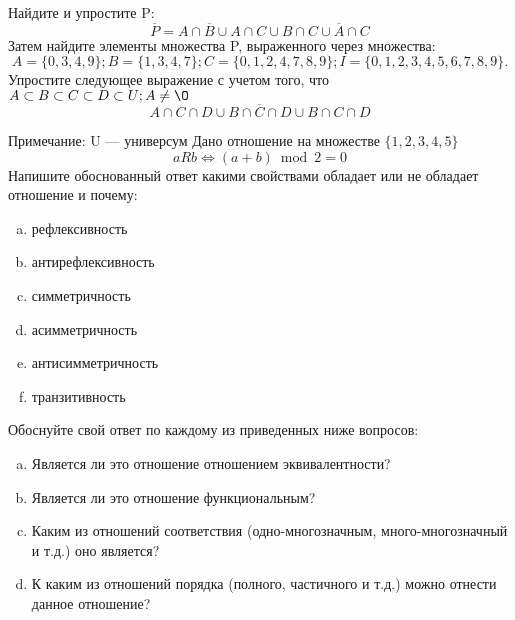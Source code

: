 \documentclass[10pt]{exam}
\begin{document}
\begin{questions}
\question
Найдите и упростите P:
\begin{equation*}
\overline{P} = A \cap \overline{B} \cup A \cap C \cup B \cap C \cup \overline{A} \cap C
\end{equation*}
Затем найдите элементы множества P, выраженного через множества:
\begin{equation*}
A = \{0, 3, 4, 9\}; 
B = \{1, 3, 4, 7\};
C = \{0, 1, 2, 4, 7, 8, 9\};
I = \{0, 1, 2, 3, 4, 5, 6, 7, 8, 9\}.
\end{equation*}\question
Упростите следующее выражение с учетом того, что $A\subset B \subset C \subset D \subset U; A \neq \O$
\begin{equation*}
A \cap C  \cap D \cup B \cap \overline{C} \cap D \cup B \cap C \cap D
\end{equation*}

Примечание: U — универсум\question
Дано отношение на множестве $\{1, 2, 3, 4, 5\}$ 
\begin{equation*}
aRb \iff (a+b) \bmod 2 =0
\end{equation*}
Напишите обоснованный ответ какими свойствами обладает или не обладает отношение и почему:   
\begin{enumerate} [a)]\setcounter{enumi}{0}
\item рефлексивность
\item антирефлексивность
\item симметричность
\item асимметричность
\item антисимметричность
\item транзитивность
\end{enumerate}

Обоснуйте свой ответ по каждому из приведенных ниже вопросов:
\begin{enumerate} [a)]\setcounter{enumi}{0}
    \item Является ли это отношение отношением эквивалентности?
    \item Является ли это отношение функциональным?
    \item Каким из отношений соответствия (одно-многозначным, много-многозначный и т.д.) оно является?
    \item К каким из отношений порядка (полного, частичного и т.д.) можно отнести данное отношение?
\end{enumerate}




\end{questions}
\end{document}
